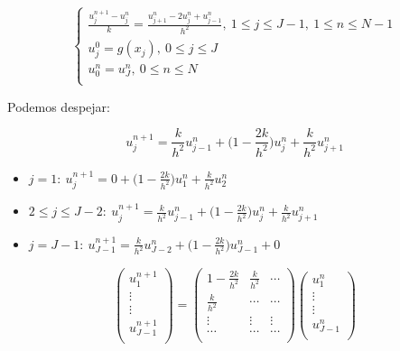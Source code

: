 $$ 
	\begin{cases}
		\frac{u_{j}^{n + 1} - u_{j}^{n}}{k} = \frac{u_{j + 1}^{n} - 2u_{j}^{n} + u_{j - 1}^{n}}{h^{2}},\ 1 \leq j \leq J - 1,\ 1 \leq n \leq N - 1\\
		u_{j}^{0} = g(x_{j}),\ 0 \leq j \leq J\\
		u_{0}^{n} = u_{J}^{n},\ 0 \leq n \leq N\\
    \end{cases}
$$

Podemos despejar:

$$u_{j}^{n + 1} = \frac{k}{h^{2}}u_{j - 1}^{n} + \bigg(1 - \frac{2k}{h^{2}}\bigg)u_{j}^{n} + \frac{k}{h^{2}}u_{j + 1}^{n}$$

\begin{itemize}
	\item $j = 1:\ u_{j}^{n + 1} = 0 + \bigg(1 - \frac{2k}{h^{2}}\bigg)u_{1}^{n} + \frac{k}{h^{2}}u_{2}^{n}$
	
	\item $2\leq j \leq J - 2:\ u_{j}^{n + 1} = \frac{k}{h^{2}}u_{j - 1}^{n} + \bigg(1 - \frac{2k}{h^{2}}\bigg)u_{j}^{n} + \frac{k}{h^{2}}u_{j + 1}^{n}$
	
	\item $j = J - 1:\ u_{J - 1}^{n + 1} = \frac{k}{h^{2}}u_{J - 2}^{n} + \bigg(1 - \frac{2k}{h^{2}}\bigg)u_{J - 1}^{n} + 0$
\end{itemize}

$$
	\begin{pmatrix}
        u_{1}^{n + 1}\\
        \vdots\\
        \vdots\\
        u_{J - 1}^{n + 1}\\
	\end{pmatrix}
	=
    \begin{pmatrix}
        1 - \frac{2k}{h^{2}} & \frac{k}{h^{2}} & \cdots\\
        \frac{k}{h^{2}} & \cdots & \cdots\\
        \vdots & \vdots & \vdots\\
        \cdots & \cdots & \cdots\\

	\end{pmatrix}
    \begin{pmatrix}
        u_{1}^{n}\\
        \vdots\\
        \vdots\\
        u_{J - 1}^{n}\\
	\end{pmatrix}
$$

